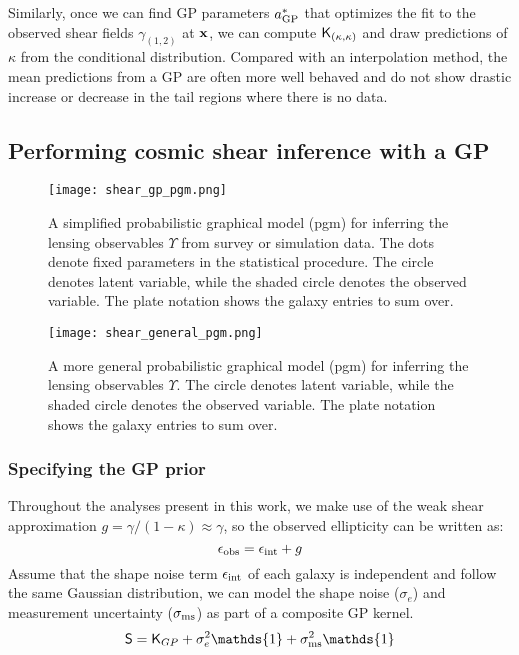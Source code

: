 Similarly, once we can find GP parameters $a_{\rm GP}^*$ that optimizes the fit to
the observed shear fields $\gamma_{(1, 2)}$ at $\mathbf{x}$, we can compute $\mathsf{K}_{(\kappa,
\kappa)}$ and draw predictions of $\kappa$ from the conditional distribution. 
Compared with an interpolation method, the mean predictions from a GP are
often more well behaved and do not show drastic increase or decrease 
in the tail regions where there is no data.  

\subsection{Performing cosmic shear inference with a GP}
\begin{figure}
	\centering
	\texttt{[image: shear\_gp\_pgm.png]}
	\caption{A simplified probabilistic graphical model (pgm) for inferring
		the lensing observables $\Upsilon$ from survey or simulation data. The dots
		denote fixed parameters in the statistical procedure. The circle denotes
		latent variable, while the shaded circle denotes 
		the observed variable. The plate notation shows the galaxy entries to sum
		over.
		\label{fig:simplified_pgm}}
\end{figure}

\begin{figure}
	\centering
	\texttt{[image: shear\_general\_pgm.png]}
	\caption{A more general probabilistic graphical model (pgm) for inferring
		the lensing observables $\Upsilon$. The circle denotes
		latent variable, while the shaded circle denotes 
		the observed variable. The plate notation shows the galaxy entries to sum
		over.
		\label{fig:general_pgm}}
\end{figure}


\subsubsection{Specifying the GP prior}
Throughout the analyses present in this work, 
we make use of the weak shear approximation 
$g = \gamma / (1 - \kappa)  \approx \gamma$, so the observed ellipticity can be
written as: 
\begin{equation}
	\epsilon_{\rm obs} = \epsilon_{\rm int} + g 
\end{equation}
Assume that the shape noise term $\epsilon_{\rm int}$ of each galaxy is 
independent and follow the same Gaussian distribution, we can model  
the shape noise ($\sigma_e$) and measurement uncertainty ($\sigma_{\rm ms}$)
as part of a composite GP kernel. 
\begin{equation}
	\mathsf{S} = \kerngp_{GP} + \sigma_e^2 \mathds{1} + \sigma_{\rm ms}^2
	\mathds{1}   
\end{equation}



